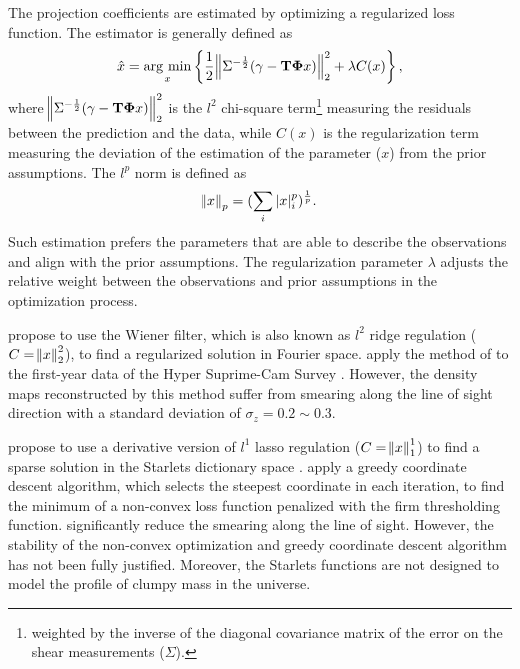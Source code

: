 \documentclass[twocolumn]{aastex62}
\newcommand{\argmin}{\mathop{\rm arg~min}\limits}
\begin{document}
The projection coefficients are estimated by optimizing a regularized loss
function. The estimator is generally defined as
\begin{equation}
\hat{x}=\argmin_{x} \left\{ \frac{1}{2}\norm{\Sigma^{-\frac{1}{2}}(\gamma- \mathbf{T\Phi} x)}_2^2+ \lambda C(x) \right\},
\end{equation}
where $\norm{\Sigma^{-\frac{1}{2}}(\gamma - \mathbf{T\Phi} x)}_2^2$ is the
$l^2$ chi-square term\footnote{weighted by the inverse of the diagonal
covariance matrix of the error on the shear measurements ($\Sigma$).} measuring
the residuals between the prediction and the data, while $C(x)$ is the
regularization term measuring the deviation of the estimation of the parameter
($x$) from the prior assumptions. The $l^p$ norm is defined as
\begin{equation}
\norm{x}_p=(\sum_{i} |x|^p_i)^{\frac{1}{p}}.
\end{equation}
Such estimation prefers the parameters that are able to describe the
observations and align with the prior assumptions.  The regularization
parameter $\lambda$ adjusts the relative weight between the observations and
prior assumptions in the optimization process.

\citet{LSS-massMap-Wiener-Simon2009} propose to use the Wiener filter, which is
also known as $l^2$ ridge regulation ($C=\norm{x}^2_2$), to find a regularized
solution in Fourier space. \citet{HSC1-massMaps} apply the method of
\citet{LSS-massMap-Wiener-Simon2009} to the first-year data of the Hyper
Suprime-Cam Survey \citep{HSC1-data}.  However, the density maps reconstructed
by this method suffer from smearing along the line of sight direction with a
standard deviation of $\sigma_z=0.2 \sim 0.3$.

\citet{LSS-massMap-Glimpse3D-Leonard2014} propose to use a derivative version
of $l^1$ lasso regulation ($C=\norm{x}^1_1$) to find a sparse solution in the
Starlets dictionary space \citep{Starlet-Starck2015}.
\citet{LSS-massMap-Glimpse3D-Leonard2014} apply a greedy coordinate descent
algorithm, which selects the steepest coordinate in each iteration, to find the
minimum of a non-convex loss function penalized with the firm thresholding
function. \citet{LSS-massMap-Glimpse3D-Leonard2014} significantly reduce the
smearing along the line of sight. However, the stability of the non-convex
optimization and greedy coordinate descent algorithm has not been fully
justified. Moreover, the Starlets functions are not designed to model the
profile of clumpy mass in the universe.
\end{document}
